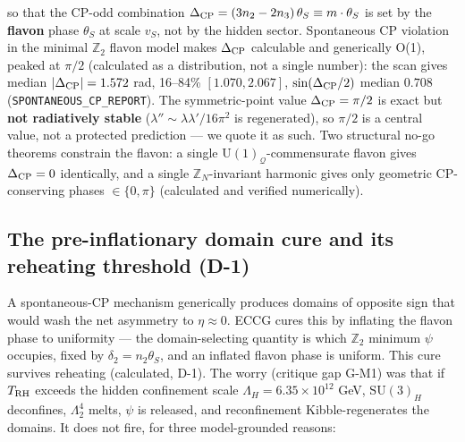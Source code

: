 \documentclass[aps,prd,preprint,nofootinbib,superscriptaddress]{revtex4-2}
\begin{document}
so that the CP-odd combination
\(\Delta_{\rm CP} = (3n_2 - 2n_3)\,\theta_S \equiv m\cdot\theta_S\) is
set by the \textbf{flavon} phase \(\theta_S\) at scale \(v_S\), not by
the hidden sector. Spontaneous CP violation in the minimal
\(\mathbb{Z}_2\) flavon model makes \(\Delta_{\rm CP}\) calculable and
generically O(1), peaked at \(\pi/2\) (calculated as a distribution, not
a single number): the scan gives median \(|\Delta_{\rm CP}| = 1.572\)
rad, 16--84\% \([1.070, 2.067]\), \(\sin(\Delta_{\rm CP}/2)\) median
\(0.708\) (\texttt{SPONTANEOUS\_\allowbreak CP\_\allowbreak REPORT}). The symmetric-point value
\(\Delta_{\rm CP} = \pi/2\) is exact but \textbf{not radiatively stable}
(\(\lambda'' \sim \lambda\lambda'/16\pi^{2}\) is regenerated), so
\(\pi/2\) is a central value, not a protected prediction --- we quote it
as such. Two structural no-go theorems constrain the flavon: a single
\(\mathrm{U}(1)_{\mathcal{Q}}\)-commensurate flavon gives
\(\Delta_{\rm CP} = 0\) identically, and a single
\(\mathbb{Z}_N\)-invariant harmonic gives only geometric CP-conserving
phases \(\in \{0, \pi\}\) (calculated and verified numerically).

\subsection{The pre-inflationary domain cure and its reheating threshold
(D-1)}\label{sec-2-3}

A spontaneous-CP mechanism generically produces domains of opposite sign
that would wash the net asymmetry to \(\eta \approx 0\). ECCG cures this
by inflating the flavon phase to uniformity --- the domain-selecting
quantity is which \(\mathbb{Z}_2\) minimum \(\psi\) occupies, fixed by
\(\delta_2 = n_2\theta_S\), and an inflated flavon phase is uniform.
This cure survives reheating (calculated, D-1). The worry (critique gap
G-M1) was that if \(T_{\rm RH}\) exceeds the hidden confinement scale
\(\Lambda_H = 6.35\times10^{12}\) GeV, \(\mathrm{SU}(3)_H\) deconfines,
\(\Lambda_2^{4}\) melts, \(\psi\) is released, and reconfinement
Kibble-regenerates the domains. It does not fire, for three
model-grounded reasons:
\end{document}
